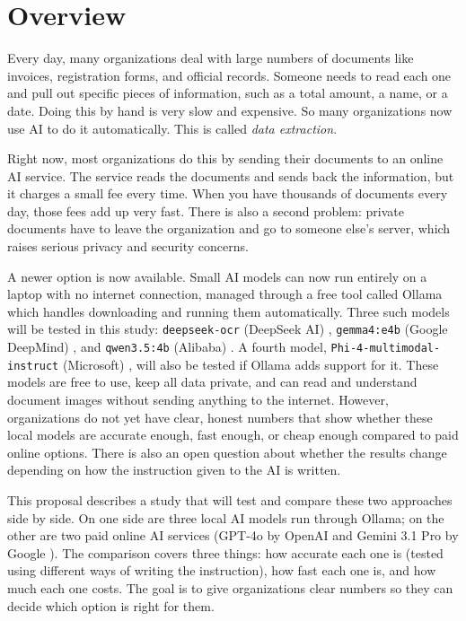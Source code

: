 \section{Overview}
\label{sec:overview}

Every day, many organizations deal with large numbers of documents like invoices, registration forms, and official records. Someone needs to read each one and pull out specific pieces of information, such as a total amount, a name, or a date. Doing this by hand is very slow and expensive. So many organizations now use AI to do it automatically. This is called \textit{data extraction}.

Right now, most organizations do this by sending their documents to an online AI service. The service reads the documents and sends back the information, but it charges a small fee every time. When you have thousands of documents every day, those fees add up very fast. There is also a second problem: private documents have to leave the organization and go to someone else's server, which raises serious privacy and security concerns.

A newer option is now available. Small AI models can now run entirely on a laptop with no internet connection, managed through a free tool called Ollama \cite{ollama_2024} which handles downloading and running them automatically. Three such models will be tested in this study: \texttt{deepseek-ocr} (DeepSeek AI) \cite{deepseek_ocr_2024}, \texttt{gemma4:e4b} (Google DeepMind) \cite{gemma4_2026}, and \texttt{qwen3.5:4b} (Alibaba) \cite{qwen3_2025}. A fourth model, \texttt{Phi-4-multimodal-instruct} (Microsoft) \cite{phi4mini_2025}, will also be tested if Ollama adds support for it. These models are free to use, keep all data private, and can read and understand document images without sending anything to the internet. However, organizations do not yet have clear, honest numbers that show whether these local models are accurate enough, fast enough, or cheap enough compared to paid online options. There is also an open question about whether the results change depending on how the instruction given to the AI is written.

This proposal describes a study that will test and compare these two approaches side by side. On one side are three local AI models run through Ollama; on the other are two paid online AI services (GPT-4o by OpenAI \cite{openai_gpt4o_2024} and Gemini 3.1 Pro by Google \cite{google_gemini_2025}). The comparison covers three things: how accurate each one is (tested using different ways of writing the instruction), how fast each one is, and how much each one costs. The goal is to give organizations clear numbers so they can decide which option is right for them.
